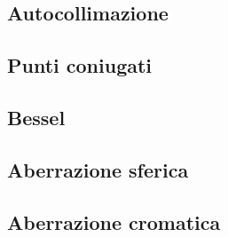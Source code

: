 \subsection{Autocollimazione}
\subsection{Punti coniugati}
\subsection{Bessel}
\subsection{Aberrazione sferica}
\subsection{Aberrazione cromatica}
